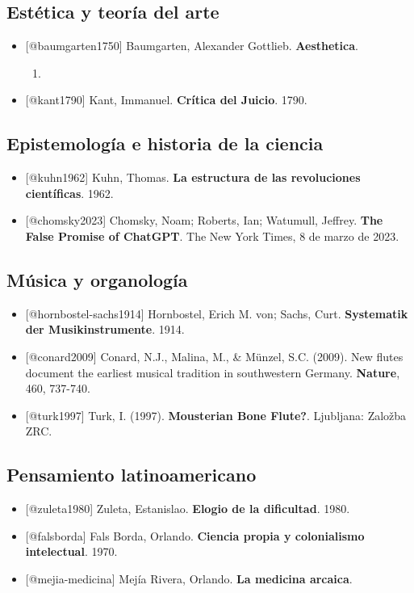 \documentclass[14pt, a4paper]{article}
\begin{document}
\subsection{Estética y teoría del arte}
\label{ref-estetica}
\begin{itemize}
\item {[}@baumgarten1750] Baumgarten, Alexander Gottlieb. \textbf{Aesthetica}.
\begin{enumerate}
\item 
\end{enumerate}
\item {[}@kant1790] Kant, Immanuel. \textbf{Crítica del Juicio}. 1790.
\end{itemize}
\subsection{Epistemología e historia de la ciencia}
\label{ref-epistemologia}
\begin{itemize}
\item {[}@kuhn1962] Kuhn, Thomas. \textbf{La estructura de las revoluciones
científicas}. 1962.
\item {[}@chomsky2023] Chomsky, Noam; Roberts, Ian; Watumull, Jeffrey. \textbf{The
False Promise of ChatGPT}. The New York Times, 8 de marzo de 2023.
\end{itemize}
\subsection{Música y organología}
\label{ref-musica}
\begin{itemize}
\item {[}@hornbostel-sachs1914] Hornbostel, Erich M. von; Sachs, Curt.
\textbf{Systematik der Musikinstrumente}. 1914.
\item {[}@conard2009] Conard, N.J., Malina, M., \& Münzel, S.C. (2009). New
flutes document the earliest musical tradition in southwestern
Germany. \textbf{Nature}, 460, 737-740.
\item {[}@turk1997] Turk, I. (1997). \textbf{Mousterian Bone Flute?}. Ljubljana:
Založba ZRC.
\end{itemize}
\subsection{Pensamiento latinoamericano}
\label{ref-latinoamerica}
\begin{itemize}
\item {[}@zuleta1980] Zuleta, Estanislao. \textbf{Elogio de la dificultad}. 1980.
\item {[}@falsborda] Fals Borda, Orlando. \textbf{Ciencia propia y colonialismo
intelectual}. 1970.
\item {[}@mejia-medicina] Mejía Rivera, Orlando. \textbf{La medicina arcaica}.
\end{itemize}
\end{document}

